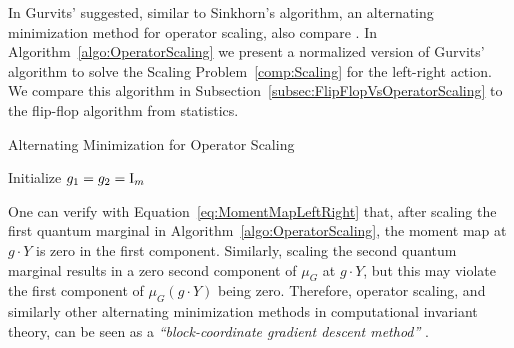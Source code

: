 In \cite{gurvits2004classical} Gurvits' suggested, similar to Sinkhorn's algorithm, an alternating minimization method for operator scaling, also compare \cite[Section~2.2]{gargOliveira2018Survey}.  In Algorithm~\ref{algo:OperatorScaling} we present a normalized version of Gurvits' algorithm to solve the Scaling Problem~\ref{comp:Scaling} for the left-right action. We compare this algorithm in Subsection~\ref{subsec:FlipFlopVsOperatorScaling} to the flip-flop algorithm from statistics.

\begin{algorithm}[h]
	\caption{Alternating Minimization for Operator Scaling} \label{algo:OperatorScaling}
	\SetAlgoLined
	\BlankLine
	Initialize $g_1 = g_2 = \operatorname{I}_m$\;
\end{algorithm}

\begin{remark}\label{rem:OperatorScaling}
	One can verify with Equation~\eqref{eq:MomentMapLeftRight} that, after scaling the first quantum marginal in Algorithm~\ref{algo:OperatorScaling}, the moment map at $g \cdot Y$ is zero in the first component. Similarly, scaling the second quantum marginal results in a zero second component of $\mu_G$ at $g \cdot Y$, but this may violate the first component of $\mu_G(g \cdot Y)$ being zero. Therefore, operator scaling, and similarly other alternating minimization methods in computational invariant theory, can be seen as a \emph{``block-coordinate gradient descent method''} \cite[page~12]{GradflowArXiv}.
	\hfill\remSymbol
\end{remark}

